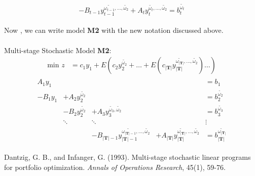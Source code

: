 \documentclass[11pt,letter]{article}
\begin{document}
\[-B_{t-1} y_{t-1}^{\tilde{\omega_{t-1}},\ldots ,\tilde{\omega_2}} + A_{t} y_{t}^{\tilde{\omega_{t}},\ldots ,\tilde{\omega_2}}	= b_{t}^{\tilde{\omega_{t}}} \] \\
Now , we can write model \textbf{M2} with the new notation discussed above.\\ \\
Multi-stage Stochastic Model \textbf{M2}: \\
\begin{align*}
\text{min }z & = c_1 y_1 +E (c_2 y_2^{\tilde{\omega_2}} +\ldots + E (c_{|\textbf{T}|} y_{|\textbf{T}|}^{\tilde{\omega_{|\textbf{T}|}},\ldots ,\tilde{\omega_2}}) \ldots )
\end{align*}
\begin{align}
\begin{matrix}
A_1 y_1		& 									&													&	& = b_1\\
-B_{1} y_1	& + A_2 y_2^{\tilde{\omega_2}}		& 													& 	& = b_2^{\tilde{\omega_2}}\\
			& - B_{2} y_2^{\tilde{\omega_2}}	&+A_3 y_3^{\tilde{\omega_3},\tilde{\omega_2}}		& 	& = b_3^{\tilde{\omega_3}}\\
			& \ddots							& \ddots											&	& \vdots \\
			&									&-B_{|\textbf{T}|-1} y_{|\textbf{T}|-1}^{\tilde{\omega_{|\textbf{T}|-1}},\ldots ,\tilde{\omega_2}}	&+A_{|\textbf{T}|} y_{|\textbf{T}|}^{\tilde{\omega_{|\textbf{T}|}},\ldots ,\tilde{\omega_2}}	& = b_{|\textbf{T}|}^{\tilde{\omega_{|\textbf{T}|}}}
\end{matrix}
\end{align}
 
\pagebreak

\begin{thebibliography}{10}

Dantzig, G. B., and Infanger, G. (1993). Multi-stage stochastic linear programs for portfolio optimization. \emph{Annals of Operations Research}, 45(1), 59-76.

\end{thebibliography}
\end{document}
